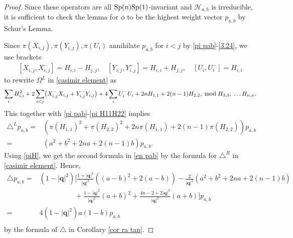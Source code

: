 \documentclass[a4paper,11pt]{amsart}
\numberwithin{equation}{section}
\begin{document}
\begin{proof}
Since these operators are all ${\rm Sp}(n){\rm Sp}(1)$-invariant and $\mathcal{H}_{a,b}$ is irreducible, it is sufficient to check the lemma for $\phi$ to be the highest weight vector $p_{a,b}$ by Schur's Lemma.

Since $\pi(X_{i,j}),\pi(Y_{i,j}),\pi(U_i)$ annihilate $p_{a,b}$ for $i<j$ by \eqref{pi pab}-\eqref{3.24}, we use brackets
\begin{equation*}\begin{aligned}
\left[X_{i,j},X_{i,j}^{-}\right]=H_{i,i}-H_{j,j},\quad\left[Y_{i,j},Y_{i,j}^{-}\right]=H_{i,i}+H_{j,j},\quad\left[U_{i},U_{i}^{-}\right]=H_{i,i}
\end{aligned}\end{equation*}
to rewrite $\Omega^L$ in \eqref{casimir element} as
\begin{equation*}\begin{aligned}
\sum_{i} H_{i,i}^2+2\sum_{i<j}\bigl(X_{i,j}^-X_{i,j}
 +Y_{i,j}^{-}Y_{i,j} \bigr)+ 4\sum_{i} U_i^{-}U_i+2nH_{1,1}+2(n-1)H_{2,2},\;{\rm mod}\; H_{3,3},\;\dots H_{n,n}.
\end{aligned}\end{equation*}
This together with \eqref{pi pab}-\eqref{pi H11H22} implies
\begin{equation}\begin{aligned}
\triangle^Lp_{a,b}=&\left( \pi(H_{1,1})^2 + \pi(H_{2,2})^2+2n\pi(H_{1,1})+2(n-1)\pi(H_{2,2}) \right)p_{a,b}\\
=&\left(a^2+b^2+2na+2(n-1)b\right)p_{a,b}.
\end{aligned}\end{equation}
Using \eqref{piH}, we get the second formula in \eqref{en pab} by the formula for $\triangle^R$ in \eqref{casimir element}. Hence,
\begin{equation*}\begin{aligned}
\triangle p_{a,b}=&(1-|\mathbf{q}|^2)\bigg[\frac{1+|\mathbf{q}|^2}{|\mathbf{q}|^2}\left((a-b)^2+2(a-b)\right)-\frac{2}{|\mathbf{q}|^2}\left(a^2+b^2+2na+2(n-1)b\right)\\ &\qquad\qquad\quad+\frac{1-|\mathbf{q}|^2}{|\mathbf{q}|^2}(a+b)^2+\frac{4n-2+2|\mathbf{q}|^2}{|\mathbf{q}|^2}(a+b)\bigg]p_{a,b}\\
=&4(1-|\mathbf{q}|^2)a( 1-b)p_{a,b}\\
\end{aligned}\end{equation*}
by the formula of $\triangle$ in Corollary \ref{cor ra tan}.
\end{proof}
\end{document}
